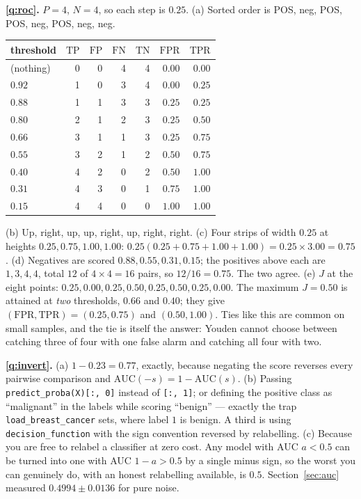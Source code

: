 \documentclass[11pt]{article}
\newcommand{\TP}{\mathrm{TP}}
\newcommand{\FP}{\mathrm{FP}}
\newcommand{\TN}{\mathrm{TN}}
\newcommand{\FN}{\mathrm{FN}}
\newcommand{\TPR}{\mathrm{TPR}}
\newcommand{\FPR}{\mathrm{FPR}}
\begin{document}
\medskip
\textbf{\ref{q:roc}.} $P = 4$, $N = 4$, so each step is $0.25$.
(a) Sorted order is POS, neg, POS, POS, neg, POS, neg, neg.
\begin{center}\small
\begin{tabular}{@{}lrrrrrr@{}}
\toprule
threshold & $\TP$ & $\FP$ & $\FN$ & $\TN$ & $\FPR$ & $\TPR$\\
\midrule
(nothing) & 0 & 0 & 4 & 4 & $0.00$ & $0.00$\\
$0.92$ & 1 & 0 & 3 & 4 & $0.00$ & $0.25$\\
$0.88$ & 1 & 1 & 3 & 3 & $0.25$ & $0.25$\\
$0.80$ & 2 & 1 & 2 & 3 & $0.25$ & $0.50$\\
$0.66$ & 3 & 1 & 1 & 3 & $0.25$ & $0.75$\\
$0.55$ & 3 & 2 & 1 & 2 & $0.50$ & $0.75$\\
$0.40$ & 4 & 2 & 0 & 2 & $0.50$ & $1.00$\\
$0.31$ & 4 & 3 & 0 & 1 & $0.75$ & $1.00$\\
$0.15$ & 4 & 4 & 0 & 0 & $1.00$ & $1.00$\\
\bottomrule
\end{tabular}
\end{center}
(b) Up, right, up, up, right, up, right, right.
(c) Four strips of width $0.25$ at heights $0.25, 0.75, 1.00, 1.00$:
$0.25(0.25 + 0.75 + 1.00 + 1.00) = 0.25 \times 3.00 = \mathbf{0.75}$.
(d) Negatives are scored $0.88, 0.55, 0.31, 0.15$; the positives above each are
$1, 3, 4, 4$, total $12$ of $4 \times 4 = 16$ pairs, so $12/16 = \mathbf{0.75}$.
The two agree.
(e) $J$ at the eight points: $0.25, 0.00, 0.25, 0.50, 0.25, 0.50, 0.25, 0.00$.
The maximum $J = 0.50$ is attained at \emph{two} thresholds, $0.66$ and $0.40$;
they give $(\FPR, \TPR) = (0.25, 0.75)$ and $(0.50, 1.00)$. Ties like this are
common on small samples, and the tie is itself the answer: Youden cannot choose
between catching three of four with one false alarm and catching all four with
two.

\medskip
\textbf{\ref{q:invert}.} (a) $1 - 0.23 = \mathbf{0.77}$, exactly, because
negating the score reverses every pairwise comparison and
$\mathrm{AUC}(-s) = 1 - \mathrm{AUC}(s)$.
(b) Passing \texttt{predict\_proba(X)[:, 0]} instead of \texttt{[:, 1]}; or
defining the positive class as ``malignant'' in the labels while scoring
``benign'' --- exactly the trap \texttt{load\_breast\_cancer} sets, where label
$1$ is benign. A third is using \texttt{decision\_function} with the sign
convention reversed by relabelling.
(c) Because you are free to relabel a classifier at zero cost. Any model with
AUC $a < 0.5$ can be turned into one with AUC $1 - a > 0.5$ by a single minus
sign, so the worst you can genuinely do, with an honest relabelling available,
is $0.5$. Section~\ref{sec:auc} measured $0.4994 \pm 0.0136$ for pure noise.
\end{document}
